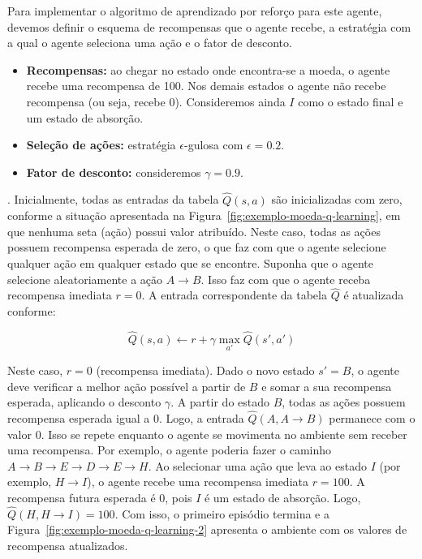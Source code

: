 Para implementar o algoritmo de aprendizado por reforço para este agente, devemos definir o esquema de recompensas que o agente recebe, a estratégia com a qual o agente seleciona uma ação e o fator de desconto.
\begin{itemize}
	\item \textbf{Recompensas:} ao chegar no estado onde encontra-se a moeda, o agente recebe uma recompensa de 100. Nos demais estados o agente não recebe recompensa (ou seja, recebe 0). Consideremos ainda $I$ como o estado final e um estado de absorção.
	\item \textbf{Seleção de ações:} estratégia $\epsilon$-gulosa com $\epsilon = 0.2$.
	\item \textbf{Fator de desconto:} consideremos $\gamma = 0.9$.
\end{itemize}
.
Inicialmente, todas as entradas da tabela $\widehat{Q}(s, a)$ são inicializadas com zero, conforme a situação apresentada na Figura~\ref{fig:exemplo-moeda-q-learning}, em que nenhuma seta (ação) possui valor atribuído. Neste caso, todas as ações possuem recompensa esperada de zero, o que faz com que o agente selecione qualquer ação em qualquer estado que se encontre. Suponha que o agente selecione aleatoriamente a ação $A \rightarrow B$. Isso faz com que o agente receba recompensa imediata $r = 0$. A entrada correspondente da tabela $\widehat{Q}$ é atualizada conforme:

$$
\widehat{Q}(s, a) \gets r + \gamma \max_{a'} \widehat{Q}(s', a')
$$

Neste caso, $r = 0$ (recompensa imediata). Dado o novo estado $s' = B$, o agente deve verificar a melhor ação possível a partir de $B$ e somar a sua recompensa esperada, aplicando o desconto $\gamma$. A partir do estado $B$, todas as ações possuem recompensa esperada igual a 0. Logo, a entrada $\widehat{Q}(A, A \rightarrow B)$ permanece com o valor 0. Isso se repete enquanto o agente se movimenta no ambiente sem receber uma recompensa. Por exemplo, o agente poderia fazer o caminho $A \rightarrow B \rightarrow E \rightarrow D \rightarrow E \rightarrow H$. Ao selecionar uma ação que leva ao estado $I$ (por exemplo, $H \rightarrow I$), o agente recebe uma recompensa imediata $r = 100$. A recompensa futura esperada é 0, pois $I$ é um estado de absorção. Logo, $\widehat{Q}(H, H \rightarrow I) = 100$. Com isso, o primeiro episódio termina e a Figura~\ref{fig:exemplo-moeda-q-learning-2} apresenta o ambiente com os valores de recompensa atualizados.

